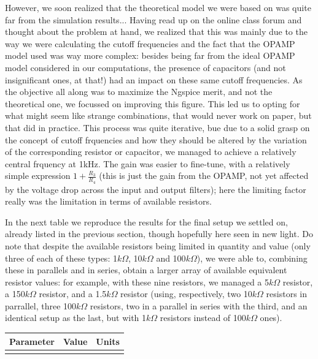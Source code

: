 However, we soon realized that the theoretical model we were based on was quite far from the simulation results... Having read up on the online class forum and thought about the problem at hand, we realized that this was mainly due to the way we were calculating the cutoff frequencies and the fact that the OPAMP model used was way more complex: besides being far from the ideal OPAMP model considered in our computations, the presence of capacitors (and not insignificant ones, at that!) had an impact on these same cutoff frequencies. As the objective all along was to maximize the Ngspice merit, and not the theoretical one, we focussed on improving this figure. This led us to opting for what might seem like strange combinations, that would never work on paper, but that did in practice. This process was quite iterative, bue due to a solid grasp on the concept of cutoff frquencies and how they should be altered by the variation of the corresponding resistor or capacitor, we managed to achieve a relatively central frquency at 1kHz. The gain was easier to fine-tune, with a relatively simple expression $1+\frac{R_3}{R_4}$ (this is just the gain from the OPAMP, not yet affected by the voltage drop across the input and output filters); here the limiting factor really was the limitation in terms of available resistors.

In the next table we reproduce the results for the final setup we settled on, already listed in the previous section, though hopefully here seen in new light. Do note that despite the available resistors being limited in quantity and value (only three of each of these types: 1$k\Omega$, 10$k\Omega$ and 100$k\Omega$), we were able to, combining these in parallels and in series, obtain a larger array of available equivalent resistor values: for example, with these nine resistors, we managed a 5$k\Omega$ resistor, a 150$k\Omega$ resistor, and a 1.5$k\Omega$ resistor (using, respectively, two 10$k\Omega$ resistors in parrallel, three 100$k\Omega$ resistors, two in a parallel in series with the third, and an identical setup as the last, but with 1$k\Omega$ resistors instead of 100$k\Omega$ ones).


\hfill
 \parbox{1\linewidth}{
  \centering
  \begin{tabular}{|l|l|r|}
    \hline    
    {\bf Parameter} & {\bf Value} & {\bf Units }\\ \hline
    
  \label{tab:params2}
  \end{tabular}
  }
\par

